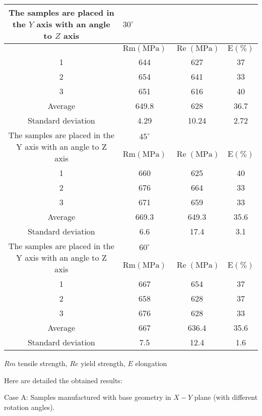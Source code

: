 \documentclass[10pt]{article}
\begin{document}
\begin{center}
\begin{tabular}{|c|c|c|c|}
\hline
\multirow[t]{2}{*}{The samples are placed in the $Y$ axis with an angle to $Z$ axis} & \multicolumn{3}{|l|}{$30^{\circ}$} \\
\hline
 & $\mathrm{Rm}(\mathrm{MPa})$ & $\operatorname{Re}(\mathrm{MPa})$ & $\mathrm{E}(\%)$ \\
\hline
1 & 644 & 627 & 37 \\
\hline
2 & 654 & 641 & 33 \\
\hline
3 & 651 & 616 & 40 \\
\hline
Average & 649.8 & 628 & 36.7 \\
\hline
Standard deviation & 4.29 & 10.24 & 2.72 \\
\hline
\multirow[t]{2}{*}{The samples are placed in the $\mathrm{Y}$ axis with an angle to $\mathrm{Z}$ axis} & $45^{\circ}$ &  &  \\
\hline
 & $\mathrm{Rm}(\mathrm{MPa})$ & $\operatorname{Re}(\mathrm{MPa})$ & $\mathrm{E}(\%)$ \\
\hline
1 & 660 & 625 & 40 \\
\hline
2 & 676 & 664 & 33 \\
\hline
3 & 671 & 659 & 33 \\
\hline
Average & 669.3 & 649.3 & 35.6 \\
\hline
Standard deviation & 6.6 & 17.4 & 3.1 \\
\hline
\multirow[t]{2}{*}{The samples are placed in the $\mathrm{Y}$ axis with an angle to $\mathrm{Z}$ axis} & $60^{\circ}$ &  &  \\
\hline
 & $\mathrm{Rm}(\mathrm{MPa})$ & $\operatorname{Re}(\mathrm{MPa})$ & $\mathrm{E}(\%)$ \\
\hline
1 & 667 & 654 & 37 \\
\hline
2 & 658 & 628 & 37 \\
\hline
3 & 676 & 628 & 33 \\
\hline
Average & 667 & 636.4 & 35.6 \\
\hline
Standard deviation & 7.5 & 12.4 & 1.6 \\
\hline
\end{tabular}
\end{center}

$R m$ tensile strength, $R e$ yield strength, $E$ elongation

Here are detailed the obtained results:

Case A: Samples manufactured with base geometry in $X-Y$ plane (with different rotation angles).
\end{document}
